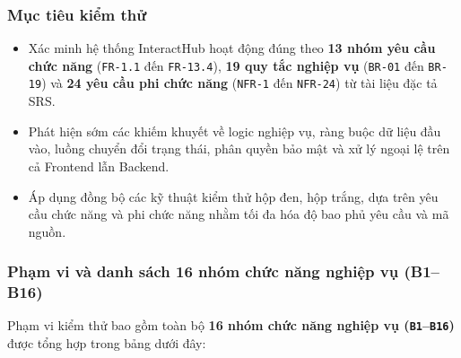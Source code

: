 \documentclass[11pt,a4paper]{article}
\begin{document}
\subsubsection{Mục tiêu kiểm thử}
\begin{itemize}[leftmargin=1.2cm, noitemsep]
    \item[\textbf{--}] Xác minh hệ thống InteractHub hoạt động đúng theo \textbf{13 nhóm yêu cầu chức năng} (\texttt{FR-1.1} đến \texttt{FR-13.4}), \textbf{19 quy tắc nghiệp vụ} (\texttt{BR-01} đến \texttt{BR-19}) và \textbf{24 yêu cầu phi chức năng} (\texttt{NFR-1} đến \texttt{NFR-24}) từ tài liệu đặc tả SRS.
    \item[\textbf{--}] Phát hiện sớm các khiếm khuyết về logic nghiệp vụ, ràng buộc dữ liệu đầu vào, luồng chuyển đổi trạng thái, phân quyền bảo mật và xử lý ngoại lệ trên cả Frontend lẫn Backend.
    \item[\textbf{--}] Áp dụng đồng bộ các kỹ thuật kiểm thử hộp đen, hộp trắng, dựa trên yêu cầu chức năng và phi chức năng nhằm tối đa hóa độ bao phủ yêu cầu và mã nguồn.
\end{itemize}

\subsubsection{Phạm vi và danh sách 16 nhóm chức năng nghiệp vụ (B1--B16)}
Phạm vi kiểm thử bao gồm toàn bộ \textbf{16 nhóm chức năng nghiệp vụ (\texttt{B1}--\texttt{B16})} được tổng hợp trong bảng dưới đây:
\end{document}
